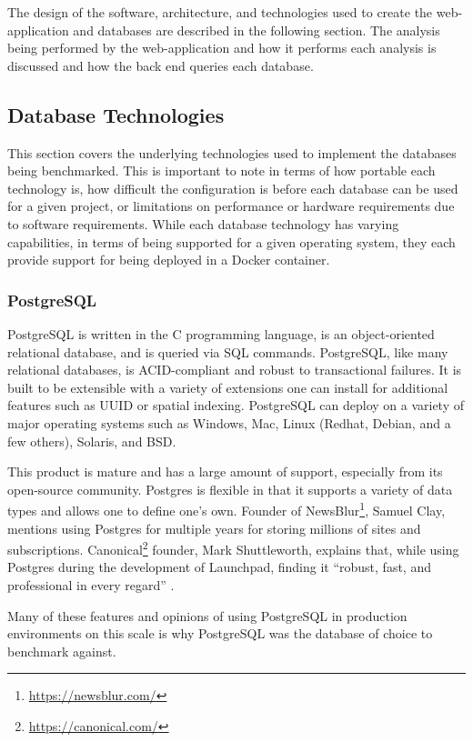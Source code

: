 The design of the software, architecture, and technologies used to create the web-application and databases are described in the following section. The analysis being performed by the web-application and how it performs each analysis is discussed and how the back end queries each database.

\subsection{Database Technologies}

This section covers the underlying technologies used to implement the databases being benchmarked. This is important to note in terms of how portable each technology is, how difficult the configuration is before each database can be used for a given project, or limitations on performance or hardware requirements due to software requirements. While each database technology has varying capabilities, in terms of being supported for a given operating system, they each provide support for being deployed in a Docker container.

\subsubsection{PostgreSQL}
PostgreSQL is written in the C programming language, is an object-oriented relational database, and is queried via SQL commands. PostgreSQL, like many relational databases, is ACID-compliant and robust to transactional failures. It is built to be extensible with a variety of extensions one can install for additional features such as UUID or spatial indexing. PostgreSQL can deploy on a variety of major operating systems such as Windows, Mac, Linux (Redhat, Debian, and a few others), Solaris, and BSD.

This product is mature and has a large amount of support, especially from its open-source community. Postgres is flexible in that it supports a variety of data types and allows one to define one's own. Founder of NewsBlur\footnote{\url{https://newsblur.com/}}, Samuel Clay, mentions using Postgres for multiple years for storing millions of sites and subscriptions. Canonical\footnote{\url{https://canonical.com/}} founder, Mark Shuttleworth, explains that, while using Postgres during the development of Launchpad, finding it ``robust, fast, and professional in every regard'' \cite{postgres-about}.

Many of these features and opinions of using PostgreSQL in production environments on this scale is why PostgreSQL was the database of choice to benchmark against.

